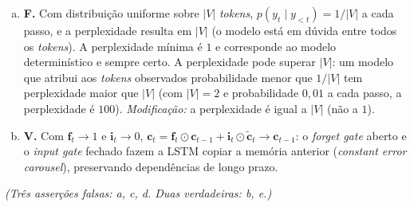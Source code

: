 \documentclass{dlproblemset}
\begin{document}
\begin{enumerate}[I)]
\begin{enumerate}[a)]
        \item \textbf{F.} Com distribuição uniforme sobre $|V|$ \textit{tokens}, $p(y_t \mid y_{<t}) = 1/|V|$ a cada passo, e a perplexidade resulta em $|V|$ (o modelo está em dúvida entre todos os \textit{tokens}). A perplexidade mínima é $1$ e corresponde ao modelo determinístico e sempre certo. A perplexidade pode superar $|V|$: um modelo que atribui aos \textit{tokens} observados probabilidade menor que $1/|V|$ tem perplexidade maior que $|V|$ (com $|V| = 2$ e probabilidade $0{,}01$ a cada passo, a perplexidade é $100$). \textit{Modificação:} a perplexidade é igual a $|V|$ (não a $1$).

        \item \textbf{V.} Com $\mathbf{f}_t \to 1$ e $\mathbf{i}_t \to 0$, $\mathbf{c}_t = \mathbf{f}_t\odot \mathbf{c}_{t-1} + \mathbf{i}_t \odot \tilde{\mathbf{c}}_t \to \mathbf{c}_{t-1}$: o \textit{forget gate} aberto e o \textit{input gate} fechado fazem a LSTM copiar a memória anterior (\textit{constant error carousel}), preservando dependências de longo prazo.
    \end{enumerate}
    \textit{(Três asserções falsas: a, c, d. Duas verdadeiras: b, e.)}

\end{enumerate}
\end{document}
